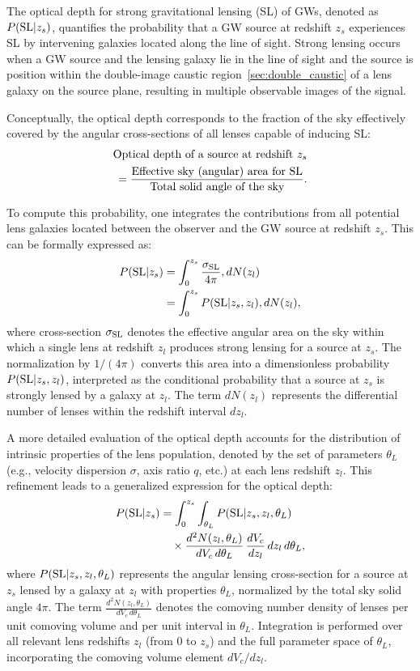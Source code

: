 \documentclass[aps,prd,twocolumn,superscriptaddress,groupedaddress,nofootinbib,showpacs,eqsecnum]{revtex4-1}
\begin{document}
The optical depth for strong gravitational lensing (SL) of GWs, denoted as $P({\rm SL}|z_s)$, quantifies the probability that a GW source at redshift $z_s$ experiences SL by intervening galaxies located along the line of sight. Strong lensing occurs when a GW source and the lensing galaxy lie in the line of sight and the source is position within the double-image caustic region~\ref{sec:double_caustic} of a lens galaxy on the source plane, resulting in multiple observable images of the signal.

Conceptually, the optical depth corresponds to the fraction of the sky effectively covered by the angular cross-sections of all lenses capable of inducing SL:
\begin{align}
\text{Optical depth of a source at redshift } z_s\notag \\
= \frac{\text{Effective sky (angular) area for SL}}{\text{Total solid angle of the sky}}.
\end{align}

To compute this probability, one integrates the contributions from all potential lens galaxies located between the observer and the GW source at redshift $z_s$. This can be formally expressed as:
\begin{align}
P({\rm SL}|z_s) &= \int_{0}^{z_s} \frac{\sigma_{\rm SL}}{4\pi} , dN(z_l) \\
&= \int_{0}^{z_s} P({\rm SL}|z_s, z_l) , dN(z_l),
\label{eqn:optical_depth1}\end{align}
where cross-section $\sigma_{\rm SL}$ denotes the effective angular area on the sky within which a single lens at redshift $z_l$ produces strong lensing for a source at $z_s$. The normalization by $1/(4\pi)$ converts this area into a dimensionless probability $P({\rm SL}|z_s, z_l)$, interpreted as the conditional probability that a source at $z_s$ is strongly lensed by a galaxy at $z_l$. The term $dN(z_l)$ represents the differential number of lenses within the redshift interval $dz_l$.

A more detailed evaluation of the optical depth accounts for the distribution of intrinsic properties of the lens population, denoted by the set of parameters $\theta_L$ (e.g., velocity dispersion $\sigma$, axis ratio $q$, etc.) at each lens redshift $z_l$. This refinement leads to a generalized expression for the optical depth:
\begin{align}
P({\rm SL}|z_s) &= \int_{0}^{z_s} \int_{\theta_L} P({\rm SL}|z_s, z_l, \theta_L) \\
                &\quad \times \frac{d^2N(z_l, \theta_L)}{dV_c \, d\theta_L} \, \frac{dV_c}{dz_l} \, dz_l \, d\theta_L,
\label{eqn:optical_depth2}\end{align}
where $P({\rm SL}|z_s, z_l, \theta_L)$ represents the angular lensing cross-section for a source at $z_s$ lensed by a galaxy at $z_l$ with properties $\theta_L$, normalized by the total sky solid angle $4\pi$. The term $\frac{d^2N(z_l, \theta_L)}{dV_c \, d\theta_L}$ denotes the comoving number density of lenses per unit comoving volume and per unit interval in $\theta_L$. Integration is performed over all relevant lens redshifts $z_l$ (from 0 to $z_s$) and the full parameter space of $\theta_L$, incorporating the comoving volume element $dV_c/dz_l$.
\end{document}
